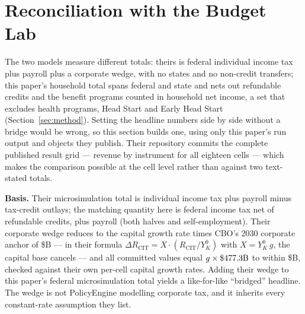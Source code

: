 \section{Reconciliation with the Budget Lab}\label{sec:reconciliation}

The two models measure different totals: theirs is federal individual income
tax plus payroll plus a corporate wedge, with no states and no non-credit
transfers; this paper's household total spans federal and state and nets out
refundable credits and the benefit programs counted in household net income,
a set that excludes health programs, Head Start and Early Head Start
(Section~\ref{sec:method}). Setting the headline numbers side by side without
a bridge would be wrong, so this section builds one, using only this paper's
run output and objects they publish. Their repository commits the complete
published result grid --- revenue by instrument for all eighteen cells ---
which makes the comparison possible at the cell level rather than against
two text-stated totals.

\textbf{Basis.} Their microsimulation total is individual income tax plus
payroll minus tax-credit outlays; the matching quantity here is federal
income tax net of refundable credits, plus payroll (both halves and
self-employment). Their corporate wedge reduces to the capital growth rate
times CBO's 2030 corporate anchor of \$\genTheirCitAnchorB B --- in their formula
$\Delta R_{\mathrm{CIT}} = X \cdot (R_{\mathrm{CIT}}/Y^0_K)$ with
$X = Y^0_K\,g$, the capital base cancels --- and all \genTheirNCells{}
committed values equal $g \times \$477.3\mathrm{B}$ to within
\$\genCitWedgeMaxDevB B, checked against their own per-cell capital growth
rates. Adding their wedge
to this paper's federal microsimulation total yields a like-for-like
``bridged'' headline. The wedge is not PolicyEngine modelling corporate tax,
and it inherits every constant-rate assumption they list.

\begin{table}[t]
\centering
\tabBridge
\caption{The bridged headline cell (Rapid~/~expansive, their headline
scenario and the largest gain they report), \$B, 2030. ``IIT (net)'' is individual income tax net
of refundable credits; the corporate wedge is theirs in both rows.}
\label{tab:bridge}
\end{table}

